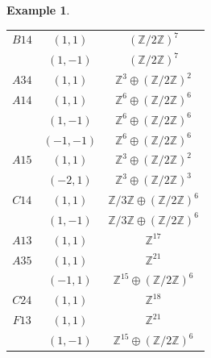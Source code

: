 \documentclass[11pt]{amsart}
\newtheorem{example}[theorem]{Example}
\theoremstyle{definition}
\newcommand{\Z}{\mathbb{Z}}
\begin{document}
\begin{example}
\begin{center}
\begin{tabular}{c|c|c}
    $B14$ & $(1,1)$ & $(\Z/2\Z)^7$ \\
        & $(1,-1)$ & $(\Z/2\Z)^7$ \\
    $A34$ & $(1,1)$ & $\Z^3 \oplus (\Z/2\Z)^2$ \\
    $A14$ & $(1,1)$ & $\Z^6 \oplus (\Z/2\Z)^6$ \\
        & $(1,-1)$ & $\Z^6 \oplus (\Z/2\Z)^6$  \\
        & $(-1,-1)$ & $\Z^6 \oplus (\Z/2\Z)^6$  \\
    $A15$ & $(1,1)$ & $\Z^3 \oplus (\Z/2\Z)^2$ \\
    & $(-2,1)$ & $\Z^3 \oplus (\Z/2\Z)^3$ \\ 
    $C14$ & $(1,1)$ & $\Z/3\Z \oplus (\Z/2\Z)^6$ \\
        & $(1,-1)$ & $\Z/3\Z \oplus (\Z/2\Z)^6$ \\
    $A13$ & $(1,1)$ & $\Z^{17}$ \\
    $A35$ & $(1,1)$ & $\Z^{21}$ \\
        & $(-1,1)$ & $\Z^{15} \oplus (\Z/2\Z)^6$ \\
    $C24$ & $(1,1)$ & $\Z^{18}$ \\
    $F13$ & $(1,1)$ & $\Z^{21}$ \\
    & $(1,-1)$ & $\Z^{15} \oplus (\Z/2\Z)^6$ \\
\end{tabular}

\end{center}

\end{example}
\end{document}
